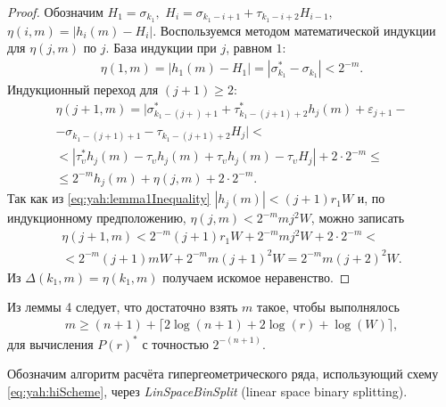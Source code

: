\begin{proof}
Обозначим
$H_1=\sigma_{k_1},$
$H_i=\sigma_{k_1-i+1} + \tau_{k_1-i+2}H_{i-1},$
$\eta(i,m)=|h_i(m)-H_i|.$
Воспользуемся методом математической индукции для $\eta(j,m)$
по $j$. База индукции при $j$, равном $1$:
%
\begin{align*}
\eta(1,m)=|h_1(m)-H_1|=|\sigma_{k_1}^*-\sigma_{k_1}|<2^{-m}.
\end{align*}
%
Индукционный переход для $(j+1)\geq 2$:
%
\begin{multline*}
\eta(j+1,m)
=|\sigma_{k_1-(j+)+1}^*+\tau_{k_1-(j+1)+2}^*h_{j}(m)+\varepsilon_{j+1}-\\
-\sigma_{k_1-(j+1)+1}-\tau_{k_1-(j+1)+2}H_{j}|<\\
<|\tau_{\upsilon}^*h_{j}(m)-\tau_{\upsilon}h_{j}(m)+
\tau_{\upsilon}h_{j}(m)-\tau_{\upsilon}H_{j}|+2\cdot 2^{-m}\leq \\
\leq 2^{-m}h_{j}(m)+\eta(j,m)+2\cdot 2^{-m}.
\end{multline*}
%
Так как из \eqref{eq:yah:lemma1Inequality} $|h_j(m)|<(j+1)r_1 W$ и,
по индукционному предположению, $\eta(j,m)<2^{-m} m j^2 W$, можно записать
%
\begin{multline*}
\eta(j+1,m)
<2^{-m}(j+1)r_1 W+2^{-m} m j^2 W+2\cdot 2^{-m}<\\
<2^{-m}(j+1)m W+2^{-m} m (j+1)^2 W = 2^{-m}m(j+2)^2 W.
\end{multline*}
%
Из $\Delta(k_1,m)=\eta(k_1,m)$ получаем искомое неравенство.
%
\end{proof}

\smallskip

Из леммы 4 следует, что достаточно взять $m$ такое, чтобы выполнялось
\begin{align}
m\ge(n+1)+\lceil 2\log(n+1)+2\log(r)+\log(W)\rceil,
\label{eq:yah:mRule}
\end{align}
для вычисления $P(r)^*$ с точностью $2^{-(n+1)}$.

Обозначим алгоритм расчёта гипергеометрического ряда, использующий
схему \eqref{eq:yah:hiScheme}, через {\itshape LinSpaceBinSplit}
(linear space binary splitting).

\smallskip

